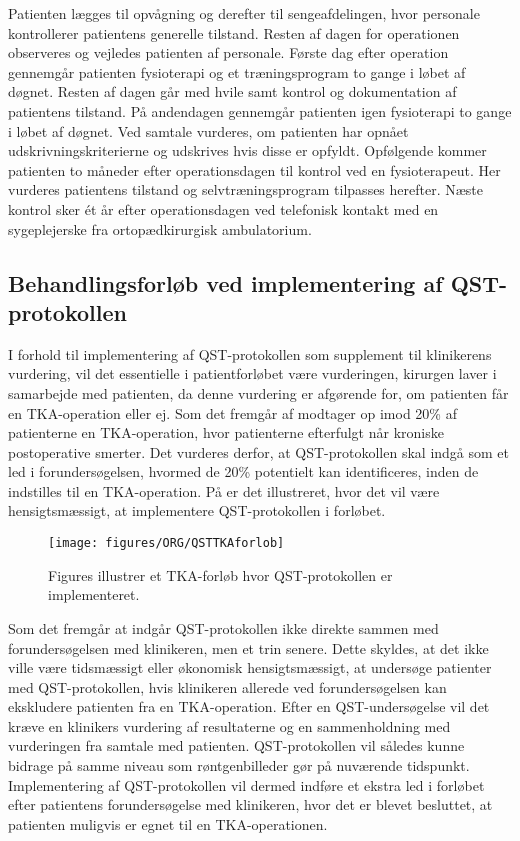 Patienten lægges til opvågning og derefter til sengeafdelingen, hvor personale kontrollerer patientens generelle tilstand. Resten af dagen for operationen observeres og vejledes patienten af personale. Første dag efter operation gennemgår patienten fysioterapi og et træningsprogram to gange i løbet af døgnet. Resten af dagen går med hvile samt kontrol og dokumentation af patientens tilstand. På andendagen gennemgår patienten igen fysioterapi to gange i løbet af døgnet. Ved samtale vurderes, om patienten har opnået udskrivningskriterierne og udskrives hvis disse er opfyldt. \citep{pritka2015}
Opfølgende kommer patienten to måneder efter operationsdagen til kontrol ved en fysioterapeut. Her vurderes patientens tilstand og selvtræningsprogram tilpasses herefter. Næste kontrol sker ét år efter operationsdagen ved telefonisk kontakt med en sygeplejerske fra ortopædkirurgisk ambulatorium. \citep{pritka2015}

\subsection{Behandlingsforløb ved implementering af QST-protokollen}
I forhold til implementering af QST-protokollen som supplement til klinikerens vurdering, vil det essentielle i patientforløbet være vurderingen, kirurgen laver i samarbejde med patienten, da denne vurdering er afgørende for, om patienten får en TKA-operation eller ej. Som det fremgår af  modtager op imod 20\% af patienterne en TKA-operation, hvor patienterne efterfulgt når kroniske postoperative smerter. Det vurderes derfor, at QST-protokollen skal indgå som et led i forundersøgelsen, hvormed de 20\% potentielt kan identificeres, inden de indstilles til en TKA-operation. På  er det illustreret, hvor det vil være hensigtsmæssigt, at implementere QST-protokollen i forløbet. 

\begin{figure}[H]
\begin{center}
	\texttt{[image: figures/ORG/QSTTKAforlob]}
\end{center}
	\caption{Figures illustrer et TKA-forløb hvor QST-protokollen er implementeret.}
	\label{fig:QSTKAforlob}
\end{figure}

Som det fremgår at  indgår QST-protokollen ikke direkte sammen med forundersøgelsen med klinikeren, men et trin senere. Dette skyldes, at det ikke ville være tidsmæssigt eller økonomisk hensigtsmæssigt, at undersøge patienter med QST-protokollen, hvis klinikeren allerede ved forundersøgelsen kan ekskludere patienten fra en TKA-operation. Efter en QST-undersøgelse vil det kræve en klinikers vurdering af resultaterne og en sammenholdning med vurderingen fra samtale med patienten. QST-protokollen vil således kunne bidrage på samme niveau som røntgenbilleder gør på nuværende tidspunkt. Implementering af QST-protokollen vil dermed indføre et ekstra led i forløbet efter patientens forundersøgelse med klinikeren, hvor det er blevet besluttet, at patienten muligvis er egnet til en TKA-operationen. 

